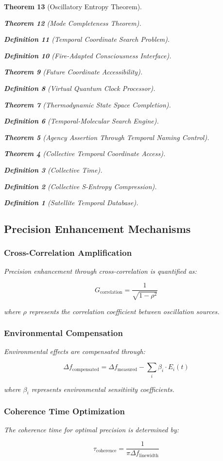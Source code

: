 \documentclass[12pt,a4paper]{article}
\newtheorem{theorem}{Theorem}[section]
\newtheorem{definition}[theorem]{Definition}
\begin{document}
\begin{theorem}[Oscillatory Entropy Theorem]
\begin{theorem}[Mode Completeness Theorem]
\begin{enumerate}
\begin{definition}[Temporal Coordinate Search Problem]
\begin{algorithm}
\begin{definition}[Fire-Adapted Consciousness Interface]
\begin{theorem}[Future Coordinate Accessibility]
\begin{definition}[Virtual Quantum Clock Processor]
\begin{itemize}
\begin{itemize}
\begin{theorem}[Thermodynamic State Space Completion]
\begin{definition}[Temporal-Molecular Search Engine]
\begin{theorem}[Agency Assertion Through Temporal Naming Control]
\begin{remark}
\begin{theorem}[Collective Temporal Coordinate Access]
\begin{definition}[Collective Time]
\begin{definition}[Collective S-Entropy Compression]
\begin{definition}[Satellite Temporal Database]
\begin{algorithm}
\begin{table}[h]
{{\subsection{Precision Enhancement Mechanisms}

\subsubsection{Cross-Correlation Amplification}

Precision enhancement through cross-correlation is quantified as:

\begin{equation}
G_{\text{correlation}} = \frac{1}{\sqrt{1 - \rho^2}}
\end{equation}

where $\rho$ represents the correlation coefficient between oscillation sources.

\subsubsection{Environmental Compensation}

Environmental effects are compensated through:

\begin{equation}
\Delta f_{\text{compensated}} = \Delta f_{\text{measured}} - \sum_{i} \beta_i \cdot E_i(t)
\end{equation}

where $\beta_i$ represents environmental sensitivity coefficients.

\subsubsection{Coherence Time Optimization}

The coherence time for optimal precision is determined by:

\begin{equation}
\tau_{\text{coherence}} = \frac{1}{\pi \Delta f_{\text{linewidth}}}
\end{equation}

}}
\end{table}
\end{algorithm}
\end{definition}
\end{definition}
\end{definition}
\end{theorem}
\end{remark}
\end{theorem}
\end{definition}
\end{theorem}
\end{itemize}
\end{itemize}
\end{definition}
\end{theorem}
\end{definition}
\end{algorithm}
\end{definition}
\end{enumerate}
\end{theorem}
\end{theorem}
\end{document}
